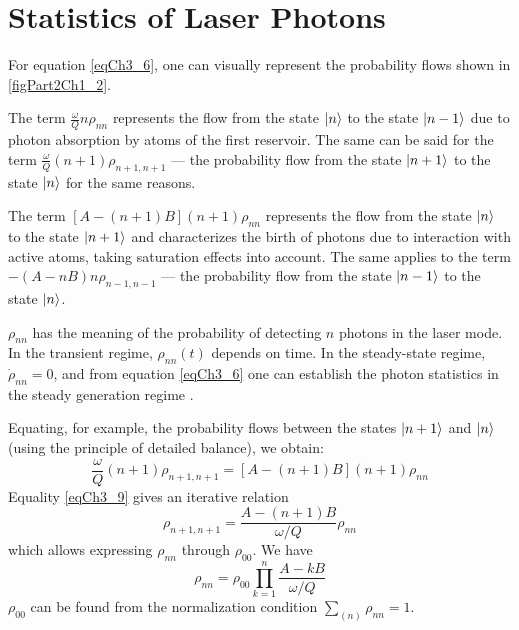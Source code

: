 \section{Statistics of Laser Photons}
For equation \eqref{eqCh3_6}, one can visually represent the probability flows shown in \autoref{figPart2Ch1_2}. 



The term $\frac{\omega}{Q} n \rho_{nn}$ represents the flow from the state $\ket{n}$ to the state $\ket{n - 1}$ due to photon absorption by atoms of the first reservoir. The same can be said for the term $\frac{\omega}{Q} \left(n + 1\right) \rho_{n + 1, n + 1}$ — the probability flow from the state $\ket{n + 1}$ to the state $\ket{n}$ for the same reasons. 

The term $\left[A - \left(n + 1\right) B\right]\left(n + 1\right) \rho_{nn}$ represents the flow from the state $\ket{n}$ to the state $\ket{n + 1}$ and characterizes the birth of photons due to interaction with active atoms, taking saturation effects into account. The same applies to the term $- \left(A - n B\right)n \rho_{n - 1, n - 1}$ — the probability flow from the state $\ket{n - 1}$ to the state $\ket{n}$.  

$\rho_{nn}$ has the meaning of the probability of detecting $n$ photons in the laser mode. In the transient regime, $\rho_{nn}\left(t\right)$ depends on time. In the steady-state regime, $\dot{\rho}_{nn} = 0$, and from equation \autoref{eqCh3_6} one can establish the photon statistics in the steady generation regime \cite{bScally1974}. 

Equating, for example, the probability flows between the states $\ket{n + 1}$ and $\ket{n}$ (using the principle of detailed balance), we obtain: 
\begin{equation}
\frac{\omega}{Q}\left(n + 1\right)\rho_{n + 1, n + 1} =
\left[A - \left(n + 1\right)B\right]\left(n + 1\right)\rho_{nn}
\label{eqCh3_9}
\end{equation}
Equality \eqref{eqCh3_9} gives an iterative relation
\begin{equation}
\rho_{n + 1, n + 1} = 
\frac{A - \left(n + 1\right)B}{\omega/Q} \rho_{nn}
\label{eqCh3_10}
\end{equation}
which allows expressing $\rho_{nn}$ through $\rho_{00}$. We have
\begin{equation}
\rho_{nn} = \rho_{00}\prod_{k = 1}^n
\frac{A - k B}{\omega/Q} 
\label{eqCh3_11}
\end{equation}
$\rho_{00}$ can be found from the normalization condition
$\sum_{(n)} \rho_{nn} = 1$.


